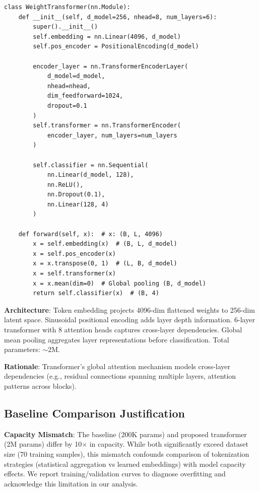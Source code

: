 \begin{verbatim}
class WeightTransformer(nn.Module):
    def __init__(self, d_model=256, nhead=8, num_layers=6):
        super().__init__()
        self.embedding = nn.Linear(4096, d_model)
        self.pos_encoder = PositionalEncoding(d_model)

        encoder_layer = nn.TransformerEncoderLayer(
            d_model=d_model,
            nhead=nhead,
            dim_feedforward=1024,
            dropout=0.1
        )
        self.transformer = nn.TransformerEncoder(
            encoder_layer, num_layers=num_layers
        )

        self.classifier = nn.Sequential(
            nn.Linear(d_model, 128),
            nn.ReLU(),
            nn.Dropout(0.1),
            nn.Linear(128, 4)
        )

    def forward(self, x):  # x: (B, L, 4096)
        x = self.embedding(x)  # (B, L, d_model)
        x = self.pos_encoder(x)
        x = x.transpose(0, 1)  # (L, B, d_model)
        x = self.transformer(x)
        x = x.mean(dim=0)  # Global pooling (B, d_model)
        return self.classifier(x)  # (B, 4)
\end{verbatim}

\textbf{Architecture}: Token embedding projects 4096-dim flattened weights to 256-dim latent space. Sinusoidal positional encoding adds layer depth information. 6-layer transformer with 8 attention heads captures cross-layer dependencies. Global mean pooling aggregates layer representations before classification. Total parameters: $\sim$2M.

\textbf{Rationale}: Transformer's global attention mechanism models cross-layer dependencies (e.g., residual connections spanning multiple layers, attention patterns across blocks).

\subsection{Baseline Comparison Justification}

\textbf{Capacity Mismatch}: The baseline (200K params) and proposed transformer (2M params) differ by 10$\times$ in capacity. While both significantly exceed dataset size (70 training samples), this mismatch confounds comparison of tokenization strategies (statistical aggregation vs learned embeddings) with model capacity effects. We report training/validation curves to diagnose overfitting and acknowledge this limitation in our analysis.

